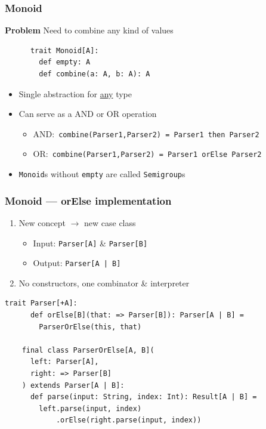 \begin{frame}[fragile]
  \frametitle{Monoid}

  \textbf{Problem} Need to combine any kind of values

  \begin{definition}[Monoid]
    \begin{lstlisting}
      trait Monoid[A]:
        def empty: A
        def combine(a: A, b: A): A
    \end{lstlisting}
  \end{definition}

  \begin{itemize}
    \item Single abstraction for \ul{any} type
    \item Can serve as a AND or OR operation
          \begin{itemize}
            \item AND:\ \texttt{combine(Parser1,Parser2) = Parser1 then Parser2}
            \item OR:\ \texttt{combine(Parser1,Parser2) = Parser1 orElse Parser2}
          \end{itemize}
    \item \texttt{Monoid}s without \texttt{empty} are called \texttt{Semigroup}s
  \end{itemize}
\end{frame}

\begin{frame}[fragile]
  \frametitle{Monoid --- orElse implementation}

  \begin{enumerate}
    \item New concept \({\rightarrow}\) new case class
          \begin{itemize}
            \item Input: \texttt{Parser[A]} \& \texttt{Parser[B]}
            \item Output: \texttt{Parser[A | B]}
          \end{itemize}
    \item No constructors, one combinator \& interpreter
  \end{enumerate}

  \begin{lstlisting}[gobble=4]
    trait Parser[+A]:
      def orElse[B](that: => Parser[B]): Parser[A | B] =
        ParserOrElse(this, that)

    final class ParserOrElse[A, B](
      left: Parser[A],
      right: => Parser[B]
    ) extends Parser[A | B]:
      def parse(input: String, index: Int): Result[A | B] =
        left.parse(input, index)
            .orElse(right.parse(input, index))
  \end{lstlisting}
\end{frame}

